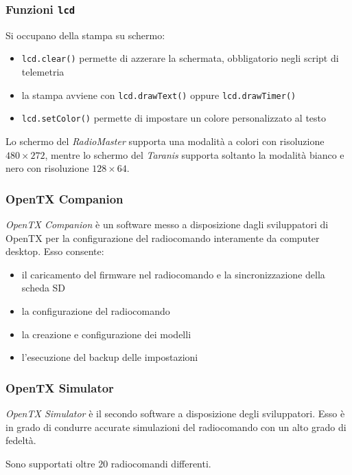 \documentclass{beamer}
\begin{document}
\begin{frame}
        \frametitle{Funzioni \texttt{lcd}}
        Si occupano della stampa su schermo:
        
        \begin{itemize}
                \item \texttt{lcd.clear()} permette di azzerare la schermata, obbligatorio negli script di telemetria
                        
                \item la stampa avviene con \texttt{lcd.drawText()} oppure \texttt{lcd.drawTimer()}
                        
                \item \texttt{lcd.setColor()} permette di impostare un colore personalizzato al testo
                        
        \end{itemize}
        Lo schermo del \emph{RadioMaster} supporta una modalità a colori con risoluzione $480 \times 272$, mentre lo schermo del \emph{Taranis} supporta soltanto la modalità bianco e nero con risoluzione $128 \times 64$.\newline
\end{frame}

\begin{frame}
        \frametitle{OpenTX Companion}
        \emph{OpenTX Companion} è un software messo a disposizione dagli sviluppatori di OpenTX per la configurazione del radiocomando interamente da computer desktop.\newline
        Esso consente:
        
        \begin{itemize}
                \item il caricamento del firmware nel radiocomando e la sincronizzazione della scheda SD
                        
                \item la configurazione del radiocomando
                        
                \item la creazione e configurazione dei modelli
                        
                \item l'esecuzione del backup delle impostazioni
        \end{itemize}
\end{frame}

\begin{frame}
        \frametitle{OpenTX Simulator}
        \emph{OpenTX Simulator} è il secondo software a disposizione degli sviluppatori. Esso è in grado di condurre accurate simulazioni del radiocomando con un alto grado di fedeltà. \newline
        
        Sono supportati oltre $20$ radiocomandi differenti.
\end{frame}
\end{document}
